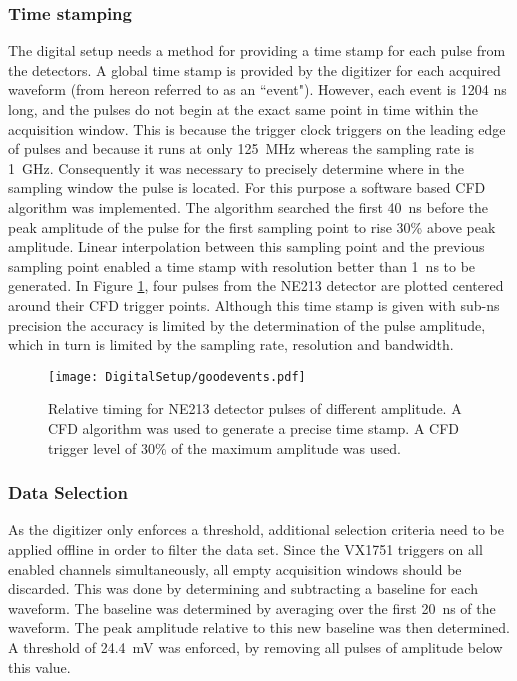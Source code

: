 \documentclass[main.tex]{subfiles}
\begin{document}
\subsubsection{Time stamping}
The digital setup needs a method for providing a time stamp for each pulse from the detectors. A global time stamp is provided by the digitizer for each acquired waveform (from hereon referred to as an ``event"). However, each event is 1204 ns long, and the pulses do not begin at the exact same point in time within the acquisition window. This is because the trigger clock triggers on the leading edge of pulses and because it runs at only \SI{125}{MHz} whereas the sampling rate is \SI{1}{GHz}. Consequently it was necessary to precisely determine where in the sampling window the pulse is located. For this purpose a software based CFD algorithm was implemented. The algorithm searched the first \SI{40}{ns} before the peak amplitude of the pulse for the first sampling point to rise 30\% above peak amplitude. Linear interpolation between this sampling point and the previous sampling point enabled a time stamp with resolution better than \SI{1}{ns} to be generated. In Figure \ref{fig:cfd_trig}, four pulses from the NE213 detector are plotted centered around their CFD trigger points. Although this time stamp is given with sub-ns precision the accuracy is limited by the determination of the pulse amplitude, which in turn is limited by the sampling rate, resolution and bandwidth. 

\begin{figure}[hb!]
    \centering
        \texttt{[image: DigitalSetup/goodevents.pdf]}
        \caption[Relative timing for NE213 detector pulses of different amplitude]{Relative timing for NE213 detector pulses of different amplitude. A CFD algorithm was used to generate a precise time stamp. A CFD trigger level of 30\% of the maximum amplitude was used.}
    \label{fig:cfd_trig} 
\end{figure}

\subsubsection{Data Selection}
As the digitizer only enforces a threshold, additional selection criteria need to be applied offline in order to filter the data set. Since the VX1751 triggers on all enabled channels simultaneously, all empty acquisition windows should be discarded. This was done by determining and subtracting a baseline for each waveform. The baseline was determined by averaging over the first \SI{20}{ns} of the waveform. The peak amplitude relative to this new baseline was then determined. A threshold of \SI{24.4}{mV} was enforced, by removing all pulses of amplitude below this value.
\end{document}
